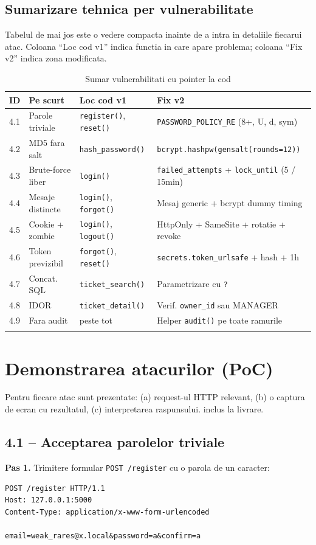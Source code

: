 \documentclass[12pt,a4paper]{article}
\begin{document}
\subsection{Sumarizare tehnica per vulnerabilitate}
Tabelul de mai jos este o vedere compacta inainte de a intra in
detaliile fiecarui atac. Coloana ``Loc cod v1'' indica functia in care
apare problema; coloana ``Fix v2'' indica zona modificata.

\begin{longtable}{p{} p{} p{} p{}}
\toprule
\textbf{ID} & \textbf{Pe scurt} & \textbf{Loc cod v1} & \textbf{Fix v2} \\
\midrule
4.1 & Parole triviale & \texttt{register()}, \texttt{reset()} & \texttt{PASSWORD\_POLICY\_RE} (8+, U, d, sym) \\
4.2 & MD5 fara salt & \texttt{hash\_password()} & \texttt{bcrypt.hashpw(gensalt(rounds=12))} \\
4.3 & Brute-force liber & \texttt{login()} & \texttt{failed\_attempts} + \texttt{lock\_until} (5 / 15min) \\
4.4 & Mesaje distincte & \texttt{login()}, \texttt{forgot()} & Mesaj generic + bcrypt dummy timing \\
4.5 & Cookie + zombie & \texttt{login()}, \texttt{logout()} & HttpOnly + SameSite + rotatie + revoke \\
4.6 & Token previzibil & \texttt{forgot()}, \texttt{reset()} & \texttt{secrets.token\_urlsafe} + hash + 1h \\
4.7 & Concat. SQL & \texttt{ticket\_search()} & Parametrizare cu \texttt{?} \\
4.8 & IDOR & \texttt{ticket\_detail()} & Verif. \texttt{owner\_id} sau MANAGER \\
4.9 & Fara audit & peste tot & Helper \texttt{audit()} pe toate ramurile \\
\bottomrule
\caption{Sumar vulnerabilitati cu pointer la cod}
\label{tab:vuln-summary}
\end{longtable}

\newpage
\section{Demonstrarea atacurilor (PoC)}\label{sec:poc}

Pentru fiecare atac sunt prezentate: (a) request-ul HTTP relevant,
(b) o captura de ecran cu rezultatul, (c) interpretarea raspunsului.
inclus la livrare.

\subsection{4.1 -- Acceptarea parolelor triviale}
\textbf{Pas 1.} Trimitere formular \texttt{POST /register} cu o parola
de un caracter:
\begin{lstlisting}[style=sh]
POST /register HTTP/1.1
Host: 127.0.0.1:5000
Content-Type: application/x-www-form-urlencoded

email=weak_rares@x.local&password=a&confirm=a
\end{lstlisting}
\end{document}
